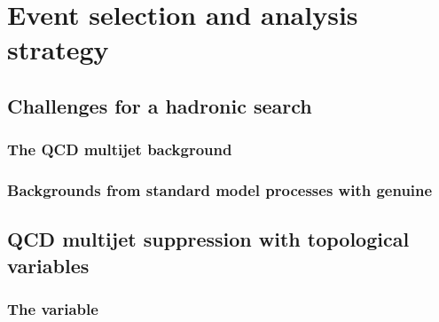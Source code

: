 \chapter{Event selection and analysis strategy}
\label{chap:selection}


\section{Challenges for a hadronic \BSM search}
\label{sec:challenge}

\subsection{The QCD multijet background}

\subsection{Backgrounds from standard model processes with genuine
\MET}

\section{QCD multijet suppression with topological variables}
\label{sec:challenge}

\subsection{The \alphat variable}

